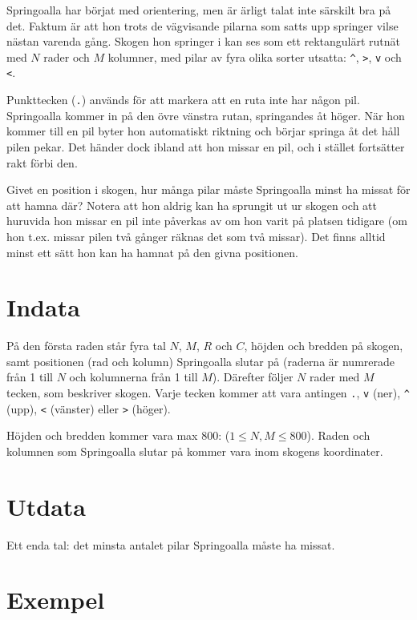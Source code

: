 
Springoalla har börjat med orientering, men är ärligt talat inte
särskilt bra på det. Faktum är att hon trots de vägvisande pilarna
som satts upp springer vilse nästan varenda gång. Skogen hon springer
i kan ses som ett rektangulärt rutnät med $N$ rader och $M$ kolumner,
med pilar av fyra olika sorter utsatta: \verb+^+, \texttt{>},
\texttt{v} och \texttt{<}.

Punkttecken (\texttt{.}) används för att markera att en ruta inte har någon
pil. Springoalla
kommer in på den övre vänstra rutan, springandes åt höger. När hon
kommer till en pil byter hon automatiskt riktning och börjar springa
åt det håll pilen pekar. Det händer dock ibland att hon missar en
pil, och i stället fortsätter rakt förbi den.

Givet en position i skogen, hur många pilar måste Springoalla minst ha
missat för att hamna där? Notera att hon aldrig kan ha sprungit ut ur
skogen och att huruvida hon missar en pil inte påverkas av om hon varit
på platsen tidigare (om hon t.ex. missar pilen två gånger räknas det
som två missar). Det finns alltid minst ett sätt hon kan ha hamnat på den givna positionen.

\section*{Indata}

På den första raden står fyra tal $N$, $M$, $R$ och $C$, höjden och
bredden på skogen, samt positionen (rad och kolumn) Springoalla slutar
på (raderna är numrerade från 1 till $N$ och kolumnerna från 1 till
$M$). Därefter följer $N$ rader med $M$ tecken, som beskriver skogen.
Varje tecken kommer att vara antingen \texttt{.}, \texttt{v} (ner),
\verb+^+ (upp), \texttt{<} (vänster) eller \texttt{>} (höger).

Höjden och bredden kommer vara max $800$: ($1 \leq N,M \leq 800$). Raden och kolumnen som
Springoalla slutar på kommer vara inom skogens koordinater.

\section*{Utdata}

Ett enda tal: det minsta antalet pilar Springoalla måste ha missat.

\section*{Exempel}

